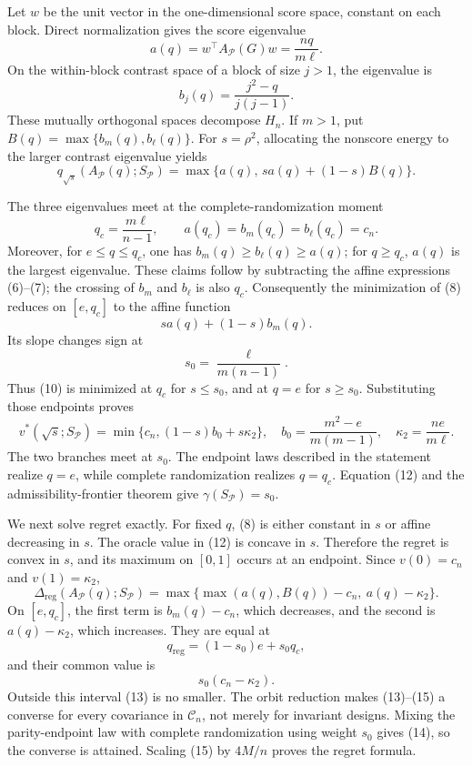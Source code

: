 Let \(w\) be the unit vector in the one-dimensional score space, constant on each block.  Direct normalization gives the score eigenvalue
\[
a(q)=w^\top A_{\mathcal P}(G)w=\frac{nq}{m\ell}.
\tag{6}
\]
On the within-block contrast space of a block of size \(j>1\), the eigenvalue is
\[
b_j(q)=\frac{j^2-q}{j(j-1)}.
\tag{7}
\]
These mutually orthogonal spaces decompose \(H_n\).  If \(m>1\), put \(B(q)=\max\{b_m(q),b_\ell(q)\}\).  For \(s=\rho^2\), allocating the nonscore energy to the larger contrast eigenvalue yields
\[
q_{\sqrt{s}}(A_{\mathcal P}(q);S_{\mathcal P})
=\max\{a(q),\,sa(q)+(1-s)B(q)\}.
\tag{8}
\]

The three eigenvalues meet at the complete-randomization moment
\[
q_c=\frac{m\ell}{n-1},
\qquad a(q_c)=b_m(q_c)=b_\ell(q_c)=c_n.
\tag{9}
\]
Moreover, for \(e\leq q\leq q_c\), one has \(b_m(q)\geq b_\ell(q)\geq a(q)\); for \(q\geq q_c\), \(a(q)\) is the largest eigenvalue.  These claims follow by subtracting the affine expressions (6)--(7); the crossing of \(b_m\) and \(b_\ell\) is also \(q_c\).  Consequently the minimization of (8) reduces on \([e,q_c]\) to the affine function
\[
sa(q)+(1-s)b_m(q).
\tag{10}
\]
Its slope changes sign at
\[
s_0=\frac{\ell}{m(n-1)}.
\tag{11}
\]
Thus (10) is minimized at \(q_c\) for \(s\leq s_0\), and at \(q=e\) for \(s\geq s_0\).  Substituting those endpoints proves
\[
v^*(\sqrt{s};S_{\mathcal P})
=\min\{c_n,(1-s)b_0+s\kappa_2\},
\quad
b_0=\frac{m^2-e}{m(m-1)},
\quad
\kappa_2=\frac{ne}{m\ell}.
\tag{12}
\]
The two branches meet at \(s_0\).  The endpoint laws described in the statement realize \(q=e\), while complete randomization realizes \(q=q_c\).  Equation (12) and the admissibility-frontier theorem give \(\gamma(S_{\mathcal P})=s_0\).

We next solve regret exactly.  For fixed \(q\), (8) is either constant in \(s\) or affine decreasing in \(s\).  The oracle value in (12) is concave in \(s\).  Therefore the regret is convex in \(s\), and its maximum on \([0,1]\) occurs at an endpoint.  Since \(v(0)=c_n\) and \(v(1)=\kappa_2\),
\[
\Delta_{\mathrm{reg}}(A_{\mathcal P}(q);S_{\mathcal P})
=\max\{\max(a(q),B(q))-c_n,\ a(q)-\kappa_2\}.
\tag{13}
\]
On \([e,q_c]\), the first term is \(b_m(q)-c_n\), which decreases, and the second is \(a(q)-\kappa_2\), which increases.  They are equal at
\[
q_{\mathrm{reg}}=(1-s_0)e+s_0q_c,
\tag{14}
\]
and their common value is
\[
s_0(c_n-\kappa_2).
\tag{15}
\]
Outside this interval (13) is no smaller.  The orbit reduction makes (13)--(15) a converse for every covariance in \(\mathcal C_n\), not merely for invariant designs.  Mixing the parity-endpoint law with complete randomization using weight \(s_0\) gives (14), so the converse is attained.  Scaling (15) by \(4M/n\) proves the regret formula.

